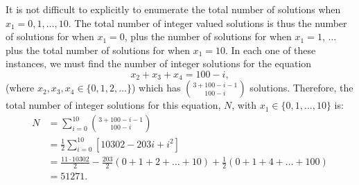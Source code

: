 \begin{problem}{20}  It is not difficult to explicitly to enumerate the total number of solutions when $x_1 = 0, 1, \ldots, 10$.  The total number of integer valued solutions is thus the number of solutions for when $x_1=0$, plus the number of solutions for when $x_1 =1$, $\ldots$ plus the total number of solutions for when $x_1 =10$.  In each one of these instances, we must find the number of integer solutions for the equation 
\begin{equation*}
x_2+x_3+x_4 = 100 - i ,
\end{equation*}
(where $x_2, x_3, x_4 \in \{0, 1, 2, \ldots \}$) which has $\binom{3+100-i-1}{100-i}$ solutions.  Therefore, the total number of integer solutions for this equation, $N$, with $x_1 \in \{0, 1, \ldots, 10 \}$ is:
\begin{align*}
N &= \sum_{i=0}^{10}\binom{3+100-i-1}{100-i} \\
&=\frac{1}{2}\sum_{i=0}^{10}\left [10302-203i+i^2 \right] \\
& = \frac{11 \cdot 10302}{2} -\frac{203}{2}(0+1+2+ \ldots+ 10)+\frac{1}{2}(0+1+4+ \ldots+ 100) \\
& = 51271.
\end{align*} 

\end{problem}

